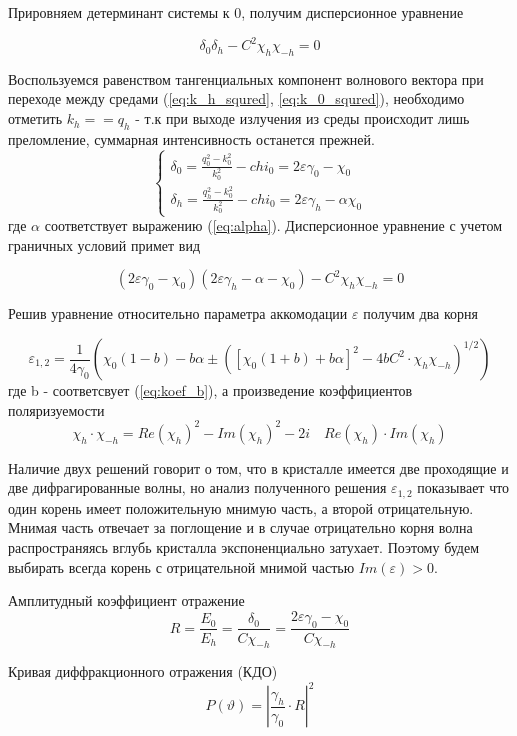 Прировняем детерминант системы к 0, получим дисперсионное уравнение

\begin{equation}
   \delta_0 \delta_h -C^2 \chi_h \chi_{-h} = 0
\end{equation}

Воспользуемся равенством тангенциальных компонент волнового вектора при переходе между средами (\ref{eq:k_h_squred}, \ref{eq:k_0_squred}),
необходимо отметить $k_h == q_h$ - т.к при выходе излучения из среды происходит лишь преломление, суммарная интенсивность останется прежней.
\begin{equation}
 \begin{cases}
   \delta_0 = \frac{q_0^2 - k_0^2}{k_0^2} - chi_0 = 2\varepsilon\gamma_0 - \chi_0
   \\
   \delta_h = \frac{q_h^2 - k_0^2}{k_0^2} - chi_0 = 2\varepsilon\gamma_h - \alpha \chi_0
 \end{cases}
\end{equation}
где $\alpha$ соответствует выражению (\ref{eq:alpha}). Дисперсионное уравнение с учетом граничных условий примет вид

\begin{equation}
   (2\varepsilon \gamma_0 - \chi_0)(2\varepsilon \gamma_h - \alpha - \chi_0) - C^2 \chi_h\chi_{-h} = 0
\end{equation}

Решив уравнение относительно параметра аккомодации $\varepsilon$ получим два корня

\begin{equation}
   \varepsilon_{1,2} = \frac{1}{4\gamma_0} \left( \chi_0 (1-b) - b\alpha \pm \left( [\chi_0(1+b)+b\alpha]^2 - 4bC^2 \cdot \chi_{h}\chi_{-h} \right)^{1/2} \right)
\end{equation}
где b - соответсвует (\ref{eq:koef_b}),  а произведение коэффициентов поляризуемости
 $$\chi_{h} \cdot \chi_{-h} = Re(\chi_{h})^2-Im(\chi_{h})^2 - 2i \quad Re(\chi_{h}) \cdot Im(\chi_{h})$$

Наличие двух решений говорит о том, что в кристалле имеется две проходящие и две дифрагированные волны, но
анализ полученного решения $ \varepsilon_{1,2}$ показывает что один корень имеет положительную мнимую часть, а второй
отрицательную. Мнимая часть отвечает за поглощение и в случае отрицательно корня волна распространяясь
вглубь кристалла экспоненциально затухает. Поэтому будем выбирать всегда корень с отрицательной мнимой частью
$Im(\varepsilon)>0$.

Амплитудный коэффициент отражение
\begin{equation}
    R = \frac{E_0}{E_h} = \frac{\delta_0}{C\chi_{-h}} = \frac{2\varepsilon\gamma_0-\chi_0}{C\chi_{-h}}
\end{equation}

Кривая диффракционного отражения (КДО)
\begin{equation}
    \label{eq:KDO_self}
    P (\vartheta) =  |\frac{\gamma_h}{\gamma_0} \cdot R|^2
\end{equation}
